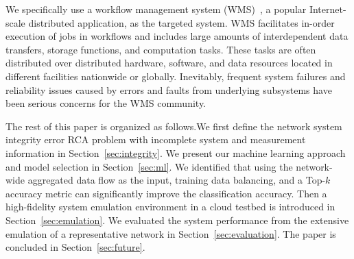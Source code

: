We specifically use a workflow management system (WMS)~\cite{deelman-fgcs-2015}, a popular Internet-scale distributed application, as the targeted system. 
WMS facilitates in-order execution of jobs in workflows and includes large amounts of interdependent
  data transfers, storage functions, and computation tasks. These tasks are often distributed over distributed hardware, software, and data resources 
  located in different facilities nationwide or globally. Inevitably, frequent system failures and reliability issues 
caused by errors and faults from underlying subsystems have been serious concerns for the WMS community. 

The rest of this paper is organized as follows.We first define the network system integrity error RCA problem with incomplete system and measurement information in Section~\ref{sec:integrity}. 
We present our machine learning approach and model selection in Section~\ref{sec:ml}. We identified that using the network-wide aggregated data flow as the input, training data balancing, 
and a Top-$k$ accuracy metric can significantly improve the classification accuracy.  Then a high-fidelity system emulation environment in a cloud testbed is introduced in Section~\ref{sec:emulation}. 
We evaluated the system performance from the extensive emulation of a representative network in Section~\ref{sec:evaluation}. The paper is concluded in Section~\ref{sec:future}.
